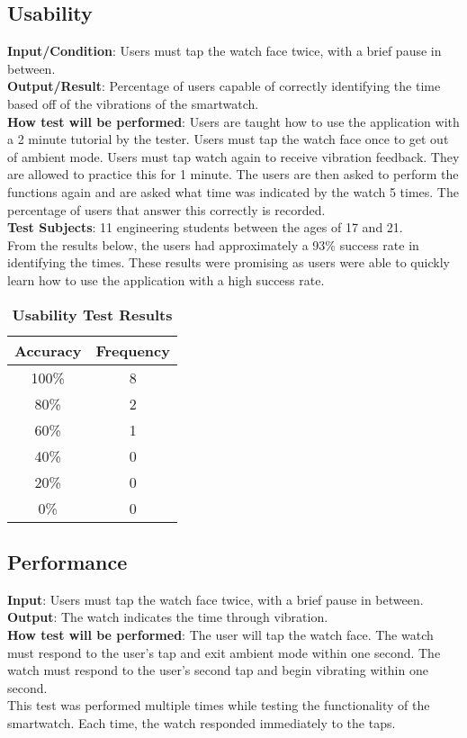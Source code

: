 \documentclass[12pt, titlepage]{article}
\begin{document}
\subsection{Usability}
\textbf{Input/Condition}: Users must tap the watch face twice, with a brief pause in between.\\
\newline
\noindent					
\textbf{Output/Result}: Percentage of users capable of correctly identifying the time based off of the vibrations of the smartwatch. \\
\newline
\noindent					
\textbf{How test will be performed}: Users are taught how to use the application with a 2 minute tutorial by the tester. Users must tap the watch face once to get out of ambient mode. Users must tap watch again to receive vibration feedback. They are allowed to practice this for 1 minute. The users are then asked to perform the functions again and are asked what time was indicated by the watch 5 times. The percentage of users that answer this correctly is recorded. \\
\newline
\noindent
\textbf{Test Subjects}: 11 engineering students between the ages of 17 and 21.\\
\newline
\noindent
From the results below, the users had approximately a 93\% success rate in identifying the times. These results were promising as users were able to quickly learn how to use the application with a high success rate.
\begin{table}[htb]
\caption{\textbf{Usability Test Results}} \label{Table}
\centering
\begin{tabular}{ |c|c| }
\hline
Accuracy & Frequency \\
\hline
100\% & 8 \\
80\% & 2 \\
60\% & 1 \\
40\% & 0\\
20\% & 0\\
0\% & 0 \\
\hline
\end{tabular}
\end{table}

\subsection{Performance}
\textbf{Input}: Users must tap the watch face twice, with a brief pause in between.\\
\newline
\noindent				
\textbf{Output}: The watch indicates the time through vibration.\\
\newline
\noindent
\textbf{How test will be performed}:  The user will tap the watch face. The watch must respond to the user's tap and exit ambient mode within one second. The watch must respond to the user's second tap and begin vibrating within one second.\\
\newline
\noindent
This test was performed multiple times while testing the functionality of the smartwatch. Each time, the watch responded immediately to the taps. 
	
\end{document}
